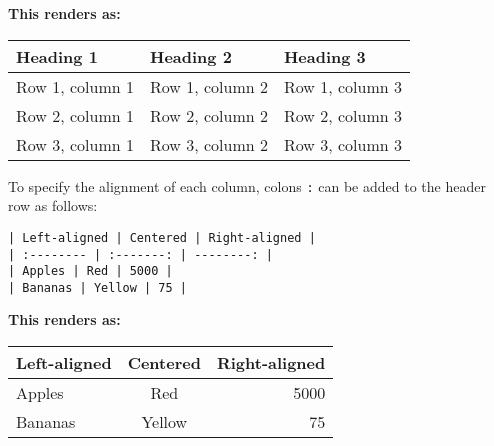 \documentclass{article}
\begin{document}
\textbf{This renders as:}

\begin{longtable}[]{@{}lll@{}}
\toprule
Heading 1 & Heading 2 & Heading 3\tabularnewline
\midrule
\endhead
Row 1, column 1 & Row 1, column 2 & Row 1, column 3\tabularnewline
Row 2, column 1 & Row 2, column 2 & Row 2, column 3\tabularnewline
Row 3, column 1 & Row 3, column 2 & Row 3, column 3\tabularnewline
\bottomrule
\end{longtable}

To specify the alignment of each column, colons \texttt{:} can be added
to the header row as follows:

\begin{verbatim}
| Left-aligned | Centered | Right-aligned |
| :-------- | :-------: | --------: |
| Apples | Red | 5000 |
| Bananas | Yellow | 75 |
\end{verbatim}

\textbf{This renders as:}

\begin{longtable}[]{@{}lcr@{}}
\toprule
Left-aligned & Centered & Right-aligned\tabularnewline
\midrule
\endhead
Apples & Red & 5000\tabularnewline
Bananas & Yellow & 75\tabularnewline
\bottomrule
\end{longtable}


    
    
    
    
\end{document}
